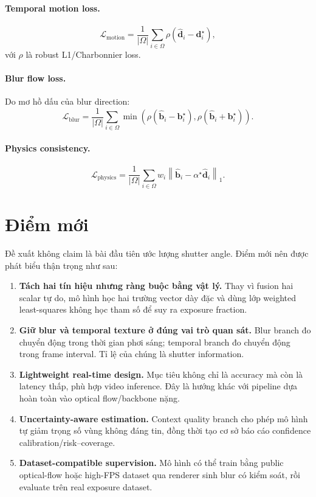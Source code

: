 \documentclass[11pt,a4paper]{article}
\newcommand{\alphagt}{\alpha^{\star}}
\newcommand{\vect}[1]{\mathbf{#1}}
\begin{document}
\paragraph{Temporal motion loss.}
\[
    \mathcal{L}_{\mathrm{motion}}
    =
    \frac{1}{|\Omega|}
    \sum_{i\in\Omega}
    \rho(\hat{\vect d}_i - \vect d_i^\star),
\]
với $\rho$ là robust L1/Charbonnier loss.

\paragraph{Blur flow loss.}
Do mơ hồ dấu của blur direction:
\[
    \mathcal{L}_{\mathrm{blur}}
    =
    \frac{1}{|\Omega|}
    \sum_{i\in\Omega}
    \min\left(
      \rho(\hat{\vect b}_i - \vect b_i^\star),
      \rho(\hat{\vect b}_i + \vect b_i^\star)
    \right).
\]

\paragraph{Physics consistency.}
\[
    \mathcal{L}_{\mathrm{physics}}
    =
    \frac{1}{|\Omega|}
    \sum_{i\in\Omega}
    w_i
    \left\|
      \hat{\vect b}_i - \alphagt \hat{\vect d}_i
    \right\|_1.
\]

\section{Điểm mới}

Đề xuất không claim là bài đầu tiên ước lượng shutter angle. Điểm mới nên được phát biểu thận trọng như sau:

\begin{enumerate}[leftmargin=1.5em]
    \item \textbf{Tách hai tín hiệu nhưng ràng buộc bằng vật lý.}
    Thay vì fusion hai scalar tự do, mô hình học hai trường vector dày đặc và dùng lớp weighted least-squares không học tham số để suy ra exposure fraction.

    \item \textbf{Giữ blur và temporal texture ở đúng vai trò quan sát.}
    Blur branch đo chuyển động trong thời gian phơi sáng; temporal branch đo chuyển động trong frame interval. Tỉ lệ của chúng là shutter information.

    \item \textbf{Lightweight real-time design.}
    Mục tiêu không chỉ là accuracy mà còn là latency thấp, phù hợp video inference. Đây là hướng khác với pipeline dựa hoàn toàn vào optical flow/backbone nặng.

    \item \textbf{Uncertainty-aware estimation.}
    Context quality branch cho phép mô hình tự giảm trọng số vùng không đáng tin, đồng thời tạo cơ sở báo cáo confidence calibration/risk--coverage.

    \item \textbf{Dataset-compatible supervision.}
    Mô hình có thể train bằng public optical-flow hoặc high-FPS dataset qua renderer sinh blur có kiểm soát, rồi evaluate trên real exposure dataset.
\end{enumerate}
\end{document}
